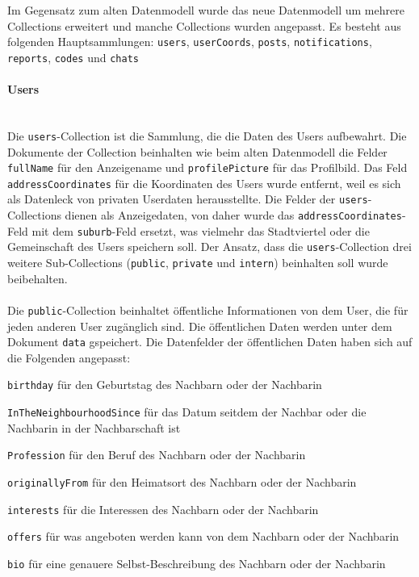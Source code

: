 Im Gegensatz zum alten Datenmodell wurde das neue Datenmodell um mehrere Collections erweitert und manche Collections wurden angepasst. Es besteht aus folgenden Hauptsammlungen: \texttt{users}, \texttt{userCoords}, \texttt{posts}, \texttt{notifications}, \texttt{reports}, \texttt{codes} und \texttt{chats}

\paragraph{Users}\mbox{} \\
Die \texttt{users}-Collection ist die Sammlung, die die Daten des Users aufbewahrt. Die Dokumente der Collection beinhalten wie beim alten Datenmodell die Felder \texttt{fullName} für den Anzeigename und \texttt{profilePicture} für das Profilbild. Das Feld \texttt{addressCoordinates} für die Koordinaten des Users wurde entfernt, weil es sich als Datenleck von privaten Userdaten herausstellte. Die Felder der \texttt{users}-Collections dienen als Anzeigedaten, von daher wurde das \texttt{addressCoordinates}-Feld mit dem \texttt{suburb}-Feld ersetzt, was vielmehr das Stadtviertel oder die Gemeinschaft des Users speichern soll.
Der Ansatz, dass die \texttt{users}-Collection drei weitere Sub-Collections (\texttt{public}, \texttt{private} und \texttt{intern}) beinhalten soll wurde beibehalten.
\\\\
Die \texttt{public}-Collection beinhaltet öffentliche Informationen von dem User, die für jeden anderen User zugänglich sind. Die öffentlichen Daten werden unter dem Dokument \texttt{data} gspeichert. Die Datenfelder der öffentlichen Daten haben sich auf die Folgenden angepasst:
\begin{compactitem}
  \item \texttt{birthday} für den Geburtstag des Nachbarn oder der Nachbarin
  \item \texttt{InTheNeighbourhoodSince} für das Datum seitdem der Nachbar oder die Nachbarin in der Nachbarschaft ist
  \item \texttt{Profession} für den Beruf des Nachbarn oder der Nachbarin
  \item \texttt{originallyFrom} für den Heimatsort des Nachbarn oder der Nachbarin
  \item \texttt{interests} für die Interessen des Nachbarn oder der Nachbarin
  \item \texttt{offers} für was angeboten werden kann von dem Nachbarn oder der Nachbarin
  \item \texttt{bio} für eine genauere Selbst-Beschreibung des Nachbarn oder der Nachbarin
\end{compactitem}
